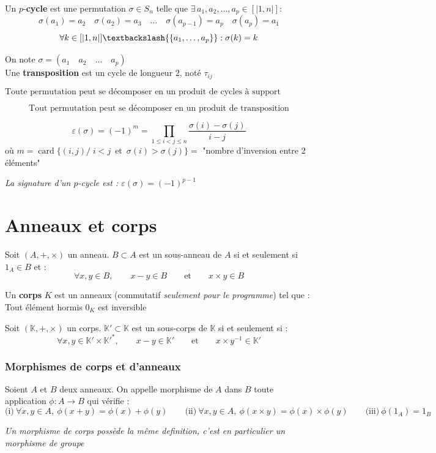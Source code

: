 \documentclass[a4paper,12pt]{report}
\newcommand{\Def}[2]{\begin{tcolorbox}[colback=white,colframe=CornflowerBlue, title=Définition : #1]#2\end{tcolorbox}}
\newcommand{\Thm}[2]{\begin{tcolorbox}[colback=white,colframe=Red!60, title=Théorème : #1]#2\end{tcolorbox}}
\DeclareMathOperator{\card}{card}
\begin{document}
\Def{$p$-cycle et transpositions}{
Un $p$-\textbf{cycle} est une permutation $\sigma \in S_n$ telle que \(\exists\,a_1,a_2,\dots,a_p \in[|1,n|]\):
\[\sigma(a_1) = a_2 \quad \sigma(a_2) = a_3\quad \dots \quad \sigma(a_{p-1}) =a_p \quad \sigma(a_p) = a_1\]
\[\forall k \in[|1,n|]\textbackslash{\{a_1,\dots,a_p\}}: \sigma(k)=k\]

On note $\sigma = (a_1 \!\quad \!a_2 \!\quad \!\dots\! \quad \!a_p)$\\
Une \textbf{transposition} est un cycle de longueur 2, noté $\tau_{ij}$
}

\Thm{Décomposition de permutation}{
\[\text{Toute permutation peut se décomposer en un produit de cycles à support disjoints}\]
}

\Thm{Décomposition de permutation 2}{
\[\text{Tout permutation peut se décomposer en un produit de transposition}\]
}

\Def{Signature d'une permutation}{
\[\varepsilon(\sigma) = (-1)^m = \prod_{1\leq i<j\leq n} \frac{\sigma(i)-\sigma(j)}{i-j}\]
où \(m = \card\{(i,j)/ \;i<j\, \text{  et } \, \sigma(i)>\sigma(j)\} =\) "nombre d'inversion entre 2 éléments"

\textit{La signature d'un $p$-cycle est : $\varepsilon(\sigma) = (-1)^{p-1}$}
}

\section{Anneaux et corps}
\Thm{Caractérisation des sous-anneaux}{
Soit $(A,+,\times)$ un anneau. $B \subset A$ est un sous-anneau de $A$ si et seulement si $1_A \in B$ et :
\[
\forall x,y \in B,\qquad x-y \in B \qquad \text{et} \qquad x\times y \in B
\]
}
\Def{Corps}{
Un \textbf{corps} $K$ est un anneaux (commutatif \textit{seulement pour le programme}) tel que :\\
Tout élément hormis $0_K$ est inversible
}

\Def{Caractérisation des sous-corps}{
Soit $(\mathbb{K},+,\times)$ un corps. $\mathbb{K}' \subset \mathbb{K}$ est un sous-corps de $\mathbb{K}$ si et seulement si :
\[
\forall x,y \in \mathbb{K}' \times \mathbb{K}'^{*},\qquad x-y \in \mathbb{K}' \qquad \text{et} \qquad x\times y^{-1} \in \mathbb{K}'
\]
}

\subsubsection{Morphismes de corps et d'anneaux}
\Def{Morphisme d'anneaux}{
Soient $A$ et $B$ deux anneaux. On appelle morphisme de $A$ dans $B$ toute application $\phi : A \to B$ qui vérifie :
\[
\text{(i)}\ \forall x,y \in A,\ \phi(x+y)=\phi(x)+\phi(y)
\qquad
\text{(ii)}\ \forall x,y \in A,\ \phi(x\times y)=\phi(x)\times\phi(y)
\qquad
\text{(iii)}\ \phi(1_A)=1_B
\]

\textit{Un morphisme de corps possède la même definition, c'est en particulier un morphisme de groupe}
}
\end{document}
